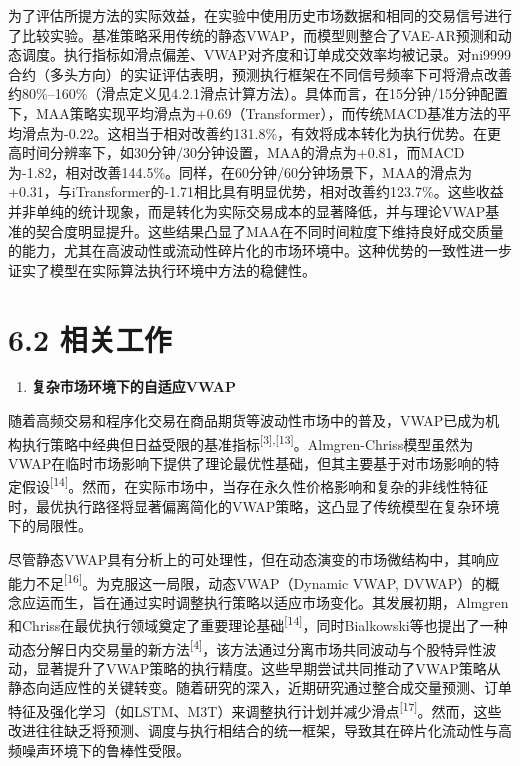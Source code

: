 为了评估所提方法的实际效益，在实验中使用历史市场数据和相同的交易信号进行了比较实验。基准策略采用传统的静态VWAP，而模型则整合了VAE-AR预测和动态调度。执行指标如滑点偏差、VWAP对齐度和订单成交效率均被记录。对ni9999合约（多头方向）的实证评估表明，预测执行框架在不同信号频率下可将滑点改善约80\%--160\%（滑点定义见4.2.1滑点计算方法）。具体而言，在15分钟/15分钟配置下，MAA策略实现平均滑点为+0.69（Transformer），而传统MACD基准方法的平均滑点为-0.22。这相当于相对改善约131.8\%，有效将成本转化为执行优势。在更高时间分辨率下，如30分钟/30分钟设置，MAA的滑点为+0.81，而MACD为-1.82，相对改善144.5\%。同样，在60分钟/60分钟场景下，MAA的滑点为+0.31，与iTransformer的-1.71相比具有明显优势，相对改善约123.7\%。这些收益并非单纯的统计现象，而是转化为实际交易成本的显著降低，并与理论VWAP基准的契合度明显提升。这些结果凸显了MAA在不同时间粒度下维持良好成交质量的能力，尤其在高波动性或流动性碎片化的市场环境中。这种优势的一致性进一步证实了模型在实际算法执行环境中方法的稳健性。

\section{6.2 相关工作}

\begin{enumerate}
\def\labelenumi{\arabic{enumi}.}
\item
  \textbf{复杂市场环境下的自适应VWAP}
\end{enumerate}

随着高频交易和程序化交易在商品期货等波动性市场中的普及，VWAP已成为机构执行策略中经典但日益受限的基准指标\textsuperscript{{[}3{]},{[}13{]}}。Almgren-Chriss模型虽然为VWAP在临时市场影响下提供了理论最优性基础，但其主要基于对市场影响的特定假设\textsuperscript{{[}14{]}}。然而，在实际市场中，当存在永久性价格影响和复杂的非线性特征时，最优执行路径将显著偏离简化的VWAP策略，这凸显了传统模型在复杂环境下的局限性。

尽管静态VWAP具有分析上的可处理性，但在动态演变的市场微结构中，其响应能力不足\textsuperscript{{[}16{]}}。为克服这一局限，动态VWAP（Dynamic
VWAP,
DVWAP）的概念应运而生，旨在通过实时调整执行策略以适应市场变化。其发展初期，Almgren和Chriss在最优执行领域奠定了重要理论基础\textsuperscript{{[}14{]}}，同时Bialkowski等也提出了一种动态分解日内交易量的新方法\textsuperscript{{[}4{]}}，该方法通过分离市场共同波动与个股特异性波动，显著提升了VWAP策略的执行精度。这些早期尝试共同推动了VWAP策略从静态向适应性的关键转变。随着研究的深入，近期研究通过整合成交量预测、订单特征及强化学习（如LSTM、M3T）来调整执行计划并减少滑点\textsuperscript{{[}17{]}}。然而，这些改进往往缺乏将预测、调度与执行相结合的统一框架，导致其在碎片化流动性与高频噪声环境下的鲁棒性受限。


